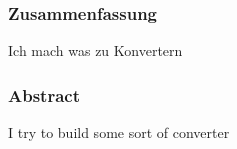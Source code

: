 
\subsubsection*{Zusammenfassung}
\label{sec:Zusammenfassung}

Ich mach was zu Konvertern


\subsubsection*{Abstract}
\label{sec:abstract}

I try to build some sort of converter

